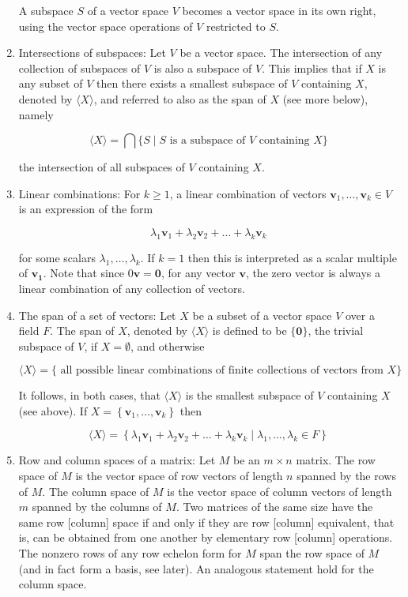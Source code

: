 \documentclass{article}
\begin{document}
\begin{enumerate}
        A subspace $S$ of a vector space $V$ becomes a vector space in its own right, using the vector space operations of $V$ restricted to $S$.

        \item Intersections of subspaces: Let $V$ be a vector space. The intersection of any collection of subspaces of $V$ is also a subspace of $V$. This implies that if $X$ is any subset of $V$ then there exists a smallest subspace of $V$ containing $X$, denoted by $\langle X\rangle$, and referred to also as the span of $X$ (see more below), namely

        $$
        \langle X\rangle=\bigcap\{S \mid S \text { is a subspace of } V \text { containing } X\}
        $$

        the intersection of all subspaces of $V$ containing $X$.

        \item Linear combinations: For $k \geq 1$, a linear combination of vectors $\mathbf{v}_{1}, \ldots, \mathbf{v}_{k} \in V$ is an expression of the form

        $$
        \lambda_{1} \mathbf{v}_{1}+\lambda_{2} \mathbf{v}_{2}+\ldots+\lambda_{k} \mathbf{v}_{k}
        $$

        for some scalars $\lambda_{1}, \ldots, \lambda_{k}$. If $k=1$ then this is interpreted as a scalar multiple of $\mathbf{v}_{\mathbf{1}}$. Note that since $0 \mathbf{v}=\mathbf{0}$, for any vector $\mathbf{v}$, the zero vector is always a linear combination of any collection of vectors.

        \item The span of a set of vectors: Let $X$ be a subset of a vector space $V$ over a field $F$. The span of $X$, denoted by $\langle X\rangle$ is defined to be $\{\mathbf{0}\}$, the trivial subspace of $V$, if $X=\emptyset$, and otherwise

        $$
        \langle X\rangle=\{\text { all possible linear combinations of finite collections of vectors from } X\}
        $$

        It follows, in both cases, that $\langle X\rangle$ is the smallest subspace of $V$ containing $X$ (see above). If $X=\left\{\mathbf{v}_{1}, \ldots, \mathbf{v}_{k}\right\}$ then

        $$
        \langle X\rangle=\left\{\lambda_{1} \mathbf{v}_{1}+\lambda_{2} \mathbf{v}_{2}+\ldots+\lambda_{k} \mathbf{v}_{k} \mid \lambda_{1}, \ldots, \lambda_{k} \in F\right\}
        $$

        \item Row and column spaces of a matrix: Let $M$ be an $m \times n$ matrix. The row space of $M$ is the vector space of row vectors of length $n$ spanned by the rows of $M$. The column space of $M$ is the vector space of column vectors of length $m$ spanned by the columns of $M$. Two matrices of the same size have the same row [column] space if and only if they are row [column] equivalent, that is, can be obtained from one another by elementary row [column] operations. The nonzero rows of any row echelon form for $M$ span the row space of $M$ (and in fact form a basis, see later). An analogous statement hold for the column space.


\end{enumerate}
\end{document}
